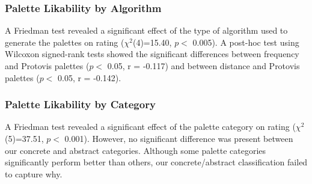 \begin{center}
\end{center}

\subsubsection{Palette Likability by Algorithm} 
A Friedman test revealed a significant effect of the type of algorithm used to generate the palettes on rating ($\chi^2$(4)=15.40, $p <$ 0.005). A post-hoc test using Wilcoxon signed-rank tests showed the significant differences between frequency and Protovis palettes ($p <$ 0.05, r = -0.117) and between distance and Protovis palettes ($p <$ 0.05, r = -0.142).

\subsubsection{Palette Likability by Category}
A Friedman test revealed a significant effect of the palette category on rating ($\chi^2$(5)=37.51, $p <$ 0.001). However, no significant difference was present between our concrete and abstract categories. Although some palette categories significantly perform better than others, our concrete/abstract classification failed to capture why.
\begin{center}
\end{center}